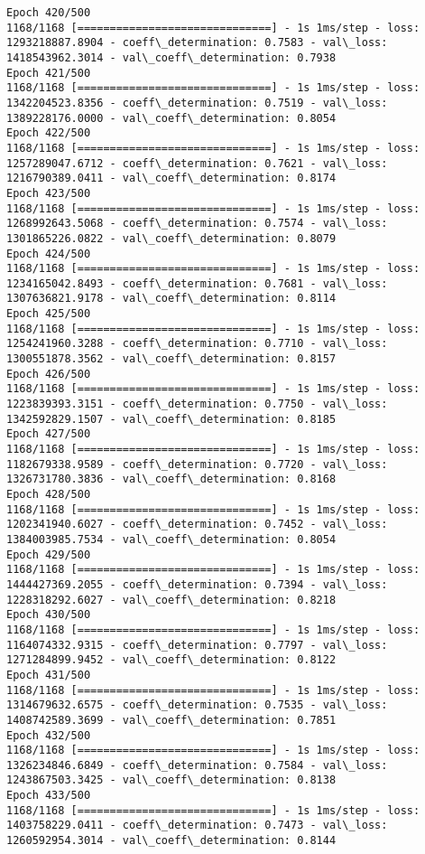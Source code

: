 \documentclass[11pt]{article}
\begin{document}
\begin{Verbatim}[commandchars=\\\{\}]
Epoch 420/500
1168/1168 [==============================] - 1s 1ms/step - loss: 1293218887.8904 - coeff\_determination: 0.7583 - val\_loss: 1418543962.3014 - val\_coeff\_determination: 0.7938
Epoch 421/500
1168/1168 [==============================] - 1s 1ms/step - loss: 1342204523.8356 - coeff\_determination: 0.7519 - val\_loss: 1389228176.0000 - val\_coeff\_determination: 0.8054
Epoch 422/500
1168/1168 [==============================] - 1s 1ms/step - loss: 1257289047.6712 - coeff\_determination: 0.7621 - val\_loss: 1216790389.0411 - val\_coeff\_determination: 0.8174
Epoch 423/500
1168/1168 [==============================] - 1s 1ms/step - loss: 1268992643.5068 - coeff\_determination: 0.7574 - val\_loss: 1301865226.0822 - val\_coeff\_determination: 0.8079
Epoch 424/500
1168/1168 [==============================] - 1s 1ms/step - loss: 1234165042.8493 - coeff\_determination: 0.7681 - val\_loss: 1307636821.9178 - val\_coeff\_determination: 0.8114
Epoch 425/500
1168/1168 [==============================] - 1s 1ms/step - loss: 1254241960.3288 - coeff\_determination: 0.7710 - val\_loss: 1300551878.3562 - val\_coeff\_determination: 0.8157
Epoch 426/500
1168/1168 [==============================] - 1s 1ms/step - loss: 1223839393.3151 - coeff\_determination: 0.7750 - val\_loss: 1342592829.1507 - val\_coeff\_determination: 0.8185
Epoch 427/500
1168/1168 [==============================] - 1s 1ms/step - loss: 1182679338.9589 - coeff\_determination: 0.7720 - val\_loss: 1326731780.3836 - val\_coeff\_determination: 0.8168
Epoch 428/500
1168/1168 [==============================] - 1s 1ms/step - loss: 1202341940.6027 - coeff\_determination: 0.7452 - val\_loss: 1384003985.7534 - val\_coeff\_determination: 0.8054
Epoch 429/500
1168/1168 [==============================] - 1s 1ms/step - loss: 1444427369.2055 - coeff\_determination: 0.7394 - val\_loss: 1228318292.6027 - val\_coeff\_determination: 0.8218
Epoch 430/500
1168/1168 [==============================] - 1s 1ms/step - loss: 1164074332.9315 - coeff\_determination: 0.7797 - val\_loss: 1271284899.9452 - val\_coeff\_determination: 0.8122
Epoch 431/500
1168/1168 [==============================] - 1s 1ms/step - loss: 1314679632.6575 - coeff\_determination: 0.7535 - val\_loss: 1408742589.3699 - val\_coeff\_determination: 0.7851
Epoch 432/500
1168/1168 [==============================] - 1s 1ms/step - loss: 1326234846.6849 - coeff\_determination: 0.7584 - val\_loss: 1243867503.3425 - val\_coeff\_determination: 0.8138
Epoch 433/500
1168/1168 [==============================] - 1s 1ms/step - loss: 1403758229.0411 - coeff\_determination: 0.7473 - val\_loss: 1260592954.3014 - val\_coeff\_determination: 0.8144

\end{Verbatim}
\end{document}
